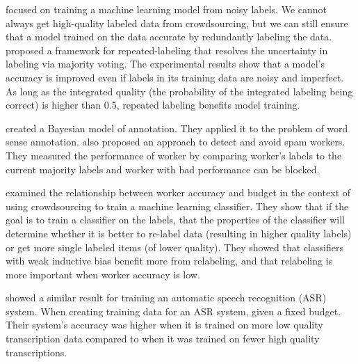 \documentclass[11pt,letterpaper]{article}
\begin{document}
 focused on training a machine learning model from noisy labels.
We cannot always get high-quality labeled data from crowdsourcing, but we can still ensure that a model trained on the data accurate by redundantly labeling the data.
 proposed a framework for repeated-labeling that resolves the uncertainty in labeling via majority voting. The experimental results show that a model's accuracy is improved even if labels in its training data are noisy and imperfect.
As long as the integrated quality (the probability of the integrated labeling being correct) is higher than 0.5, repeated labeling benefits model training. 

 created a Bayesian model of annotation. They applied it to the problem of word sense annotation.  also proposed an approach to detect and avoid spam workers. 
They measured the performance of worker by comparing worker's labels to the current majority labels and worker with bad performance can be blocked. 

 examined the relationship between worker accuracy and budget in the context of using crowdsourcing to train a machine learning classifier.  They show that if the goal is to train a classifier on the labels, that the properties of the classifier will determine whether it is better to re-label data (resulting in higher quality labels) or get more single labeled items (of lower quality). They showed that classifiers with weak inductive bias  benefit more from relabeling, and that relabeling is more important when worker accuracy is low. %

 showed a similar result for training an automatic speech recognition (ASR) system.  When creating training data for an ASR system, given a fixed budget. Their system's accuracy was higher when it is trained on more low quality transcription data compared to when it was trained on fewer high quality transcriptions.
\end{document}
